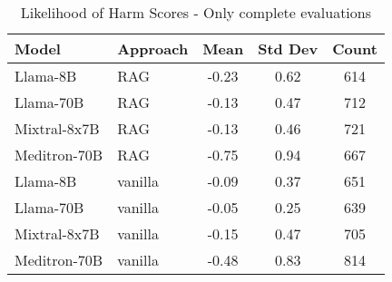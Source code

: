 \begin{table}[h]
\centering
\begin{tabular}{llccc}
\toprule
Model & Approach & Mean & Std Dev & Count \\
\midrule
Llama-8B & RAG & -0.23 & 0.62 & 614 \\
Llama-70B & RAG & -0.13 & 0.47 & 712 \\
Mixtral-8x7B & RAG & -0.13 & 0.46 & 721 \\
Meditron-70B & RAG & -0.75 & 0.94 & 667 \\
Llama-8B & vanilla & -0.09 & 0.37 & 651 \\
Llama-70B & vanilla & -0.05 & 0.25 & 639 \\
Mixtral-8x7B & vanilla & -0.15 & 0.47 & 705 \\
Meditron-70B & vanilla & -0.48 & 0.83 & 814 \\
\bottomrule
\end{tabular}
\caption{Likelihood of Harm Scores - Only complete evaluations}
\label{tab:likelihood_of_harm_complete}
\end{table}